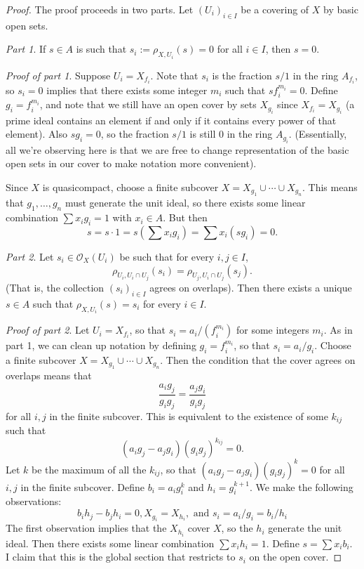 \begin{definition}
\begin{proof}
The proof proceeds in two parts. Let $ (U_i)_{i \in I}$ be a covering of $ X$ by basic open sets.

\emph{Part 1}. If $ s \in A$ is such that $ s_i := \rho_{X, U_i}(s) = 0$ for all $ i \in I$, then $ s = 0$.

\emph{Proof of part 1}. Suppose $ U_i = X_{f_i}$. Note that $ s_i$ is the fraction $ s/1$ in the ring $ A_{f_i}$, so $ s_i = 0$ implies that there exists some integer $ m_i$ such that $ sf_i^{m_i} = 0$. Define $ g_i = f_i ^{m_i}$, and note that we still have an open cover by sets $ X_{g_i}$ since $ X_{f_i} = X_{g_i}$ (a prime ideal contains an element if and only if it contains every power of that element). Also $ s g_i = 0$, so the fraction $ s/1$ is still $ 0$ in the ring $ A_{g_i}$. (Essentially, all we're observing here is that we are free to change representation of the basic open sets in our cover to make notation more convenient).

Since $ X$ is quasicompact, choose a finite subcover $ X = X_{g_1} \cup \dotsb \cup X_{g_n}$. This means that $ g_1, \dotsc, g_n$ must generate the unit ideal, so there exists some linear combination $ \sum x_i g_i = 1$ with $ x_i \in A$. But then
\[ s = s \cdot 1 = s \left( \sum x_i g_i \right) = \sum x_i (s g_i) = 0.\]

\emph{Part 2}. Let $ s_i \in \mathcal{O}_X(U_i)$ be such that for every $ i, j \in I$,
\[ \rho_{U_i, U_i \cap U_j}(s_i) = \rho_{U_j, U_i \cap U_j}(s_j).\]
(That is, the collection $ (s_i)_{i \in I}$ agrees on overlaps). Then there exists a unique $ s \in A$ such that $ \rho_{X, U_i}(s) = s_i$ for every $ i \in I$.

\emph{Proof of part 2}. Let $ U_i = X_{f_i}$, so that $ s_i = a_i/(f_i^{m_i})$ for some integers $ m_i$. As in part 1, we can clean up notation by defining $ g_i = f_i^{m_i}$, so that $ s_i = a_i/g_i$. Choose a finite subcover $ X = X_{g_1} \cup \dotsb \cup X_{g_n}$. Then the condition that the cover agrees on overlaps means that
\[ \frac{a_i g_j}{g_i g_j} = \frac{a_j g_i}{g_i g_j} \]
for all $ i, j$ in the finite subcover. This is equivalent to the existence of some $ k_{ij}$ such that
\[ (a_i g_j - a_j g_i) (g_i g_j)^{k_{ij}} = 0.\]
Let $ k$ be the maximum of all the $ k_{ij}$, so that $ (a_i g_j - a_j g_i)(g_i g_j)^k = 0$ for all $ i, j$ in the finite subcover. Define $ b_i = a_i g_i^k$ and $ h_i = g_i^{k+1}$. We make the following observations:
\[ b_i h_j - b_j h_i = 0, X_{g_i} = X_{h_i}, \text{ and } s_i = a_i/g_i = b_i/h_i \]
The first observation implies that the $ X_{h_i}$ cover $ X$, so the $ h_i$ generate the unit ideal. Then there exists some linear combination $ \sum x_i h_i = 1$. Define $ s = \sum x_i b_i$. I claim that this is the global section that restricts to $ s_i$ on the open cover.


\end{proof}
\end{definition}
